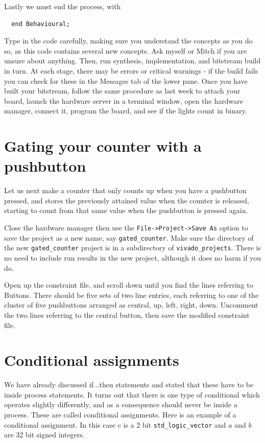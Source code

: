 \documentclass[../physical_computing.tex]{subfiles}
\begin{document}
Lastly we must end the process, with 
\begin{verbatim}
  end Behavioural;
\end{verbatim}

Type in the code carefully, making sure you understand the concepts as you do so, as this code contains several new concepts. Ask myself or Mitch if you are unsure about anything. Then, run synthesis, implementation, and bitstream build in turn. At each stage, there may be errors or critical warnings - if the build fails you can check for these in the Messages tab of the lower pane. Once you have built your bitstream, follow the same procedure as last week to attach your board, launch the hardware server in a terminal window, open the hardware manager, connect it, program the board, and see if the lights count in binary.

\section{Gating your counter with a pushbutton}
\label{sec:buttons}

Let us next make a counter that only counts up when you have a pushbutton pressed, and stores the previously attained value when the counter is released, starting to count from that same value when the pushbutton is pressed again.

Close the hardware manager then use the \texttt{File->Project->Save As} option to save the project as a new name,
say \texttt{gated\_counter}. Make sure the directory of the new  \texttt{gated\_counter} project is in a subdirectory of \texttt{vivado\_projects}. There is no need to include run results in the new project, although it does no harm if you do.

Open up the constraint file, and scroll down until you find the lines referring to Buttons. There should be five sets of two line entries, each referring to one of the cluster of five pushbuttons arranged as 
central, up, left, right, down. Uncomment the two lines referring to the central button, then save the modified constraint file.

\section{Conditional assignments}
\label{sec:conditionalassignments}

We have already discussed if...then statements and stated that these have to be inside process statements. It turns out that there is one type of conditional which operates slightly differently, and as a consequence should never be inside a process. These are called
conditional assignments. Here is an example of a conditional assignment. In this case c is a 2 bit \texttt{std\_logic\_vector} and $a$ and $b$ are 32 bit signed integers.
\end{document}
